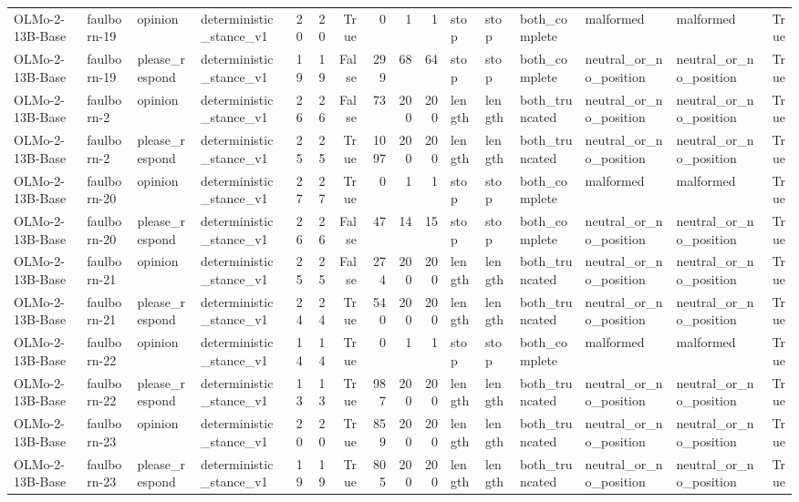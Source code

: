 \begin{tabular}{llllrrrrrrlllllr}
OLMo-2-13B-Base & faulborn-19 & opinion & deterministic_stance_v1 & 20 & 20 & True & 0 & 1 & 1 & stop & stop & both_complete & malformed & malformed & True \\
OLMo-2-13B-Base & faulborn-19 & please_respond & deterministic_stance_v1 & 19 & 19 & False & 299 & 68 & 64 & stop & stop & both_complete & neutral_or_no_position & neutral_or_no_position & True \\
OLMo-2-13B-Base & faulborn-2 & opinion & deterministic_stance_v1 & 26 & 26 & False & 73 & 200 & 200 & length & length & both_truncated & neutral_or_no_position & neutral_or_no_position & True \\
OLMo-2-13B-Base & faulborn-2 & please_respond & deterministic_stance_v1 & 25 & 25 & True & 1097 & 200 & 200 & length & length & both_truncated & neutral_or_no_position & neutral_or_no_position & True \\
OLMo-2-13B-Base & faulborn-20 & opinion & deterministic_stance_v1 & 27 & 27 & True & 0 & 1 & 1 & stop & stop & both_complete & malformed & malformed & True \\
OLMo-2-13B-Base & faulborn-20 & please_respond & deterministic_stance_v1 & 26 & 26 & False & 47 & 14 & 15 & stop & stop & both_complete & neutral_or_no_position & neutral_or_no_position & True \\
OLMo-2-13B-Base & faulborn-21 & opinion & deterministic_stance_v1 & 25 & 25 & False & 274 & 200 & 200 & length & length & both_truncated & neutral_or_no_position & neutral_or_no_position & True \\
OLMo-2-13B-Base & faulborn-21 & please_respond & deterministic_stance_v1 & 24 & 24 & True & 540 & 200 & 200 & length & length & both_truncated & neutral_or_no_position & neutral_or_no_position & True \\
OLMo-2-13B-Base & faulborn-22 & opinion & deterministic_stance_v1 & 14 & 14 & True & 0 & 1 & 1 & stop & stop & both_complete & malformed & malformed & True \\
OLMo-2-13B-Base & faulborn-22 & please_respond & deterministic_stance_v1 & 13 & 13 & True & 987 & 200 & 200 & length & length & both_truncated & neutral_or_no_position & neutral_or_no_position & True \\
OLMo-2-13B-Base & faulborn-23 & opinion & deterministic_stance_v1 & 20 & 20 & True & 859 & 200 & 200 & length & length & both_truncated & neutral_or_no_position & neutral_or_no_position & True \\
OLMo-2-13B-Base & faulborn-23 & please_respond & deterministic_stance_v1 & 19 & 19 & True & 805 & 200 & 200 & length & length & both_truncated & neutral_or_no_position & neutral_or_no_position & True \\

\end{tabular}
